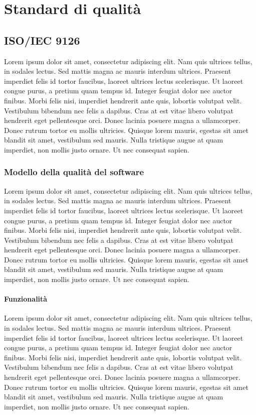 \section{Standard di qualità}
\subsection{ISO/IEC 9126}
Lorem ipsum dolor sit amet, consectetur adipiscing elit. Nam quis ultrices tellus, in sodales lectus. Sed mattis magna ac mauris interdum ultrices. Praesent imperdiet felis id tortor faucibus, laoreet ultrices lectus scelerisque. Ut laoreet congue purus, a pretium quam tempus id. Integer feugiat dolor nec auctor finibus. Morbi felis nisi, imperdiet hendrerit ante quis, lobortis volutpat velit. Vestibulum bibendum nec felis a dapibus. Cras at est vitae libero volutpat hendrerit eget pellentesque orci. Donec lacinia posuere magna a ullamcorper. Donec rutrum tortor eu mollis ultricies. Quisque lorem mauris, egestas sit amet blandit sit amet, vestibulum sed mauris. Nulla tristique augue at quam imperdiet, non mollis justo ornare. Ut nec consequat sapien.

\subsubsection{Modello della qualità del software}
Lorem ipsum dolor sit amet, consectetur adipiscing elit. Nam quis ultrices tellus, in sodales lectus. Sed mattis magna ac mauris interdum ultrices. Praesent imperdiet felis id tortor faucibus, laoreet ultrices lectus scelerisque. Ut laoreet congue purus, a pretium quam tempus id. Integer feugiat dolor nec auctor finibus. Morbi felis nisi, imperdiet hendrerit ante quis, lobortis volutpat velit. Vestibulum bibendum nec felis a dapibus. Cras at est vitae libero volutpat hendrerit eget pellentesque orci. Donec lacinia posuere magna a ullamcorper. Donec rutrum tortor eu mollis ultricies. Quisque lorem mauris, egestas sit amet blandit sit amet, vestibulum sed mauris. Nulla tristique augue at quam imperdiet, non mollis justo ornare. Ut nec consequat sapien.

\paragraph{Funzionalità} 
Lorem ipsum dolor sit amet, consectetur adipiscing elit. Nam quis ultrices tellus, in sodales lectus. Sed mattis magna ac mauris interdum ultrices. Praesent imperdiet felis id tortor faucibus, laoreet ultrices lectus scelerisque. Ut laoreet congue purus, a pretium quam tempus id. Integer feugiat dolor nec auctor finibus. Morbi felis nisi, imperdiet hendrerit ante quis, lobortis volutpat velit. Vestibulum bibendum nec felis a dapibus. Cras at est vitae libero volutpat hendrerit eget pellentesque orci. Donec lacinia posuere magna a ullamcorper. Donec rutrum tortor eu mollis ultricies. Quisque lorem mauris, egestas sit amet blandit sit amet, vestibulum sed mauris. Nulla tristique augue at quam imperdiet, non mollis justo ornare. Ut nec consequat sapien.


